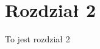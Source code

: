 \documentclass[document.tex]{subfiles}
\begin{document}
\chapter{Rozdział 2}
To jest rozdział 2
\end{document}
